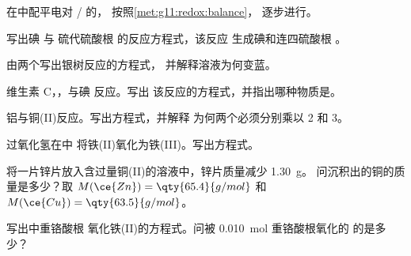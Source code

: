 \begin{exercise}[$\star\star$]\label{exo:g11:redox:6}
在中配平电对 / 的，
按照\cref{met:g11:redox:balance}，
逐步进行。
\end{exercise}

\begin{exercise}[$\star\star$]\label{exo:g11:redox:7}
写出碘  与
硫代硫酸根  的反应方程式，该反应
生成碘和连四硫酸根 。
\end{exercise}

\begin{exercise}[$\star\star$]\label{exo:g11:redox:8}
由两个写出银树反应的方程式，
并解释溶液为何变蓝。
\end{exercise}

\begin{exercise}[$\star\star$]\label{exo:g11:redox:9}
维生素 C，，与碘  反应。写出
该反应的方程式，并指出哪种物质是。
\end{exercise}

\begin{exercise}[$\star\star$]\label{exo:g11:redox:10}
铝与铜(II)反应。写出方程式，并解释
为何两个必须分别乘以 2 和 3。
\end{exercise}

\begin{exercise}[$\star\star$]\label{exo:g11:redox:11}
过氧化氢在中
将铁(II)氧化为铁(III)。写出方程式。
\end{exercise}

\begin{exercise}[$\star\star\star$]\label{exo:g11:redox:12}
将一片锌片放入含过量铜(II)的溶液中，锌片质量减少 \qty{1.30}{g}。
问沉积出的铜的质量是多少？取
$M(\ce{Zn}) = \qty{65.4}{g/mol}$ 和 $M(\ce{Cu}) = \qty{63.5}{g/mol}$。
\end{exercise}

\begin{exercise}[$\star\star\star$]\label{exo:g11:redox:13}
写出中重铬酸根
氧化铁(II)的方程式。问被
\qty{0.010}{mol} 重铬酸根氧化的  的是多少？
\end{exercise}

